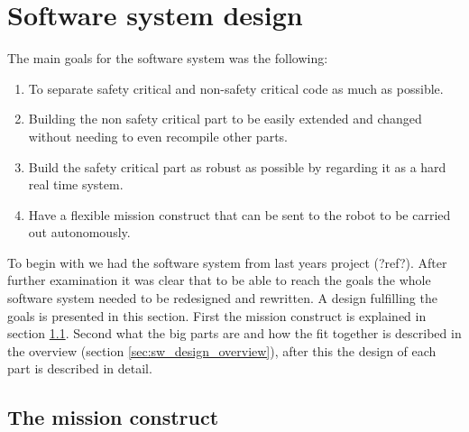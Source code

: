 \documentclass[main.tex]{subfiles}
\begin{document}
\section{Software system design}

The main goals for the software system was the following:
\begin{enumerate}
    \item To separate safety critical and non-safety critical code as much as possible.
    \item Building the non safety critical part to be easily extended and changed without needing to even recompile other parts.
    \item Build the safety critical part as robust as possible by regarding it as a hard real time system.
    \item Have a flexible mission construct that can be sent to the robot to be carried out autonomously.
\end{enumerate}


To begin with we had the software system from last years project (?ref?).
After further examination it was clear that to be able to reach the goals the whole software system
needed to be redesigned and rewritten. A design fulfilling the goals is presented in this section.
First the mission construct is explained in section \ref{sec:mission}.
Second what the big parts are and how the fit together is described in the overview (section \ref{sec:sw_design_overview}),
after this the design of each part is described in detail.

\subsection{The mission construct}
\label{sec:mission}
\end{document}
